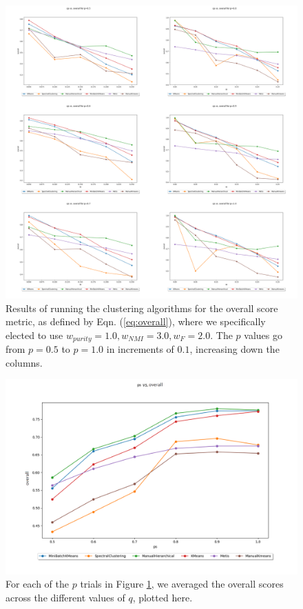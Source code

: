 \documentclass{article}
\begin{document}
\begin{figure}[H]
    \centering
    \includegraphics[width=1.15\textwidth]{results/results_overall.png}
    \caption[Clustering overall score results]{Results of running the clustering algorithms for the overall score metric, as defined by Eqn. (\ref{eq:overall}), where we specifically elected to use $w_{purity}=1.0, w_{NMI}=3.0,w_{F}=2.0$. The $p$ values go from $p=0.5$ to $p=1.0$ in increments of $0.1$, increasing down the columns.}
    \label{fig:results_overall}
\end{figure}

\begin{figure}[H]
    \centering
    \includegraphics[width=1.0\textwidth]{results/results_average.png}
    \caption[Clustering average overall score across $p$]{For each of the $p$ trials in Figure \ref{fig:results_overall}, we averaged the overall scores across the different values of $q$, plotted here.}
    \label{fig:results_average}
\end{figure}
\end{document}
